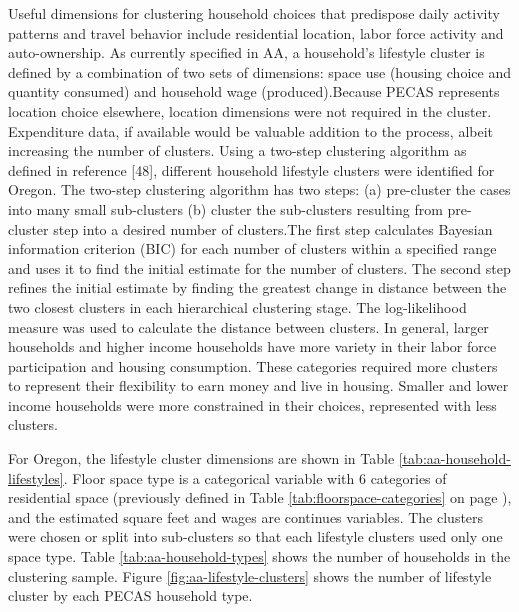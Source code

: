 Useful dimensions for clustering household choices that predispose daily activity patterns and travel behavior include residential location, labor force activity and auto-ownership. As currently specified in AA, a household's lifestyle cluster is defined by a combination of two sets of dimensions: space use (housing choice and quantity consumed) and household wage (produced).Because PECAS represents location choice elsewhere, location dimensions were not required in the cluster. Expenditure data, if available would be valuable addition to the process, albeit increasing the number of clusters. Using a two-step clustering algorithm as defined in reference [48], different household lifestyle clusters were identified for Oregon. The two-step clustering algorithm has two steps: (a) pre-cluster the cases into many small sub-clusters (b) cluster the sub-clusters resulting from pre-cluster step into a desired number of clusters.The first step calculates Bayesian information criterion (BIC) for each number of clusters within a specified range and uses it to find the initial estimate for the number of clusters. The second step refines the initial estimate by finding the greatest change in distance between the two closest clusters in each hierarchical clustering stage. The log-likelihood measure was used to calculate the distance between clusters. In general, larger households and higher income households have more variety in their labor force participation and housing consumption. These categories required more clusters to represent their flexibility to earn money and live in housing. Smaller and lower income households were more constrained in their choices, represented with less clusters.  

For Oregon, the lifestyle cluster dimensions are shown in Table \ref{tab:aa-household-lifestyles}. Floor space type is a categorical variable with 6 categories of residential space (previously defined in Table \ref{tab:floorspace-categories} on page \pageref{tab:floorspace-categories}), and the estimated square feet and wages are continues variables.  The clusters were chosen or split into sub-clusters so that each lifestyle clusters used only one space type. Table \ref{tab:aa-household-types} shows the number of households in the clustering sample. Figure \ref{fig:aa-lifestyle-clusters} shows the number of lifestyle cluster by each PECAS household type.

